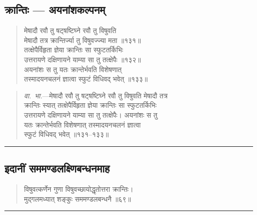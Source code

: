 \documentclass[11pt,a4paper]{article}
\newcommand{\longline}{\noindent\rule{\textwidth}{0.4pt}}
\newcommand{\dev}[1]{{\devanagarifont #1}}
\newenvironment{shloka}{%
  \begin{quote}
  \small
  \setlength{\leftmargin}{2em}
  \devanagarifont
}{\end{quote}}
\newenvironment{vyakhya}{%
  \begin{quote}
  \small
  \setlength{\leftmargin}{1em}
  \devanagarifont
}{\end{quote}}
\newcommand{\skt}[1]{{\devanagarifont #1}}
\begin{document}
\subsection{\dev{क्रान्तिः — अयनांशकल्पनम्}}

\begin{shloka}
\skt{मेषादौ रवौ तु षट्षष्टिघ्ने रवौ तु विषुवति}\\[0.3em]
\skt{मेषादौ तत्र क्रान्तिर्ज्या तु विषुवज्ज्या मता ॥१३१॥}\\[0.3em]
\skt{तत्क्षेपैर्विहृता ज्ञेया क्रान्तिः सा स्फुटतर्किभिः}\\[0.3em]
\skt{उत्तरायणे दक्षिणायने याम्या सा तु तत्क्षेपैः ॥१३२॥}\\[0.3em]
\skt{अयनांशः स तु यतः क्रान्तेर्भवति विशेषणात्}\\[0.3em]
\skt{तस्मादयनचलनं ज्ञात्वा स्फुटं विधिवद् भवेत् ॥१३३॥}
\end{shloka}

\begin{vyakhya}
\textit{वा.~भा.}—\skt{मेषादौ रवौ तु षट्षष्टिघ्ने रवौ तु विषुवति मेषादौ तत्र}\\
\skt{क्रान्तिः स्यात् तत्क्षेपैर्विहृता ज्ञेया क्रान्तिः सा स्फुटतर्किभिः}\\
\skt{उत्तरायणे दक्षिणायने याम्या सा तु तत्क्षेपैः। अयनांशः स तु}\\
\skt{यतः क्रान्तेर्भवति विशेषणात् तस्मादयनचलनं ज्ञात्वा}\\
\skt{स्फुटं विधिवद् भवेत् ॥१३१--१३३॥}
\end{vyakhya}

\longline

\subsection{\dev{इदानीं सममण्डलक्ष्णिबन्धनमाह}}

\begin{shloka}
\skt{विषुवत्कर्णेन गुणा विषुवच्छायोद्धृतोत्तरा क्रान्तिः।}\\
\skt{मुद्गलमध्यात् शङ्कुः सममण्डलबन्धनै ॥६९॥}
\end{shloka}

\longline
\end{document}

